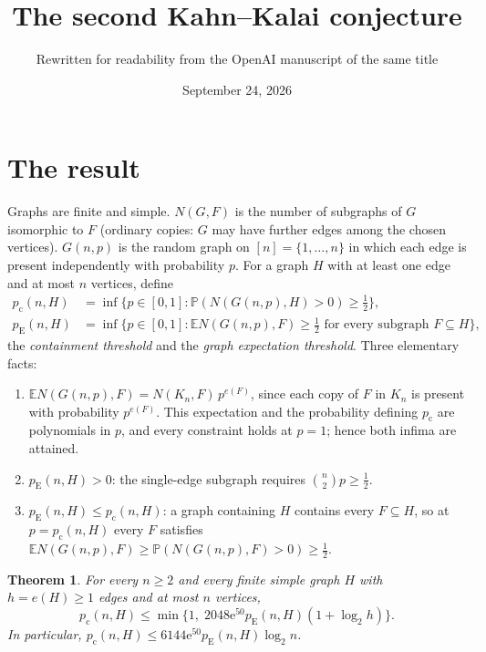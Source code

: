 \documentclass[11pt]{article}
\title{The second Kahn--Kalai conjecture}
\author{Rewritten for readability from the OpenAI manuscript of the same title}
\date{September 24, 2026}
\newtheorem{theorem}{Theorem}[section]
\numberwithin{equation}{section}
\newcommand{\PP}{\mathbb P}
\newcommand{\EE}{\mathbb E}
\newcommand{\pc}{p_{\mathrm c}}
\newcommand{\pE}{p_{\mathrm E}}
\newcommand{\ee}{\mathrm e}
\begin{document}
\maketitle

\section{The result}\label{sec:introduction}

Graphs are finite and simple. $N(G,F)$ is the number of subgraphs of $G$
isomorphic to $F$ (ordinary copies: $G$ may have further edges among the
chosen vertices). $G(n,p)$ is the random graph on $[n]=\{1,\ldots,n\}$ in
which each edge is present independently with probability $p$. For a graph
$H$ with at least one edge and at most $n$ vertices, define
\begin{align*}
 \pc(n,H)&=\inf\{p\in[0,1]:\PP(N(G(n,p),H)>0)\ge\tfrac12\},\\
 \pE(n,H)&=\inf\{p\in[0,1]:\EE N(G(n,p),F)\ge\tfrac12
                 \text{ for every subgraph }F\subseteq H\},
\end{align*}
the \emph{containment threshold} and the \emph{graph expectation
threshold}. Three elementary facts:
\begin{enumerate}[label=(\alph*),itemsep=1pt,topsep=3pt]
 \item\label{fact:a} $\EE N(G(n,p),F)=N(K_n,F)\,p^{e(F)}$, since each copy
 of $F$ in $K_n$ is present with probability $p^{e(F)}$. This expectation
 and the probability defining $\pc$ are polynomials in $p$, and every
 constraint holds at $p=1$; hence both infima are attained.
 \item $\pE(n,H)>0$: the single-edge subgraph requires
 $\binom n2p\ge\tfrac12$.
 \item $\pE(n,H)\le\pc(n,H)$: a graph containing $H$ contains every
 $F\subseteq H$, so at $p=\pc(n,H)$ every $F$ satisfies
 $\EE N(G(n,p),F)\ge\PP(N(G(n,p),F)>0)\ge\tfrac12$.
\end{enumerate}

\begin{theorem}\label{thm:main}
For every $n\ge2$ and every finite simple graph $H$ with $h=e(H)\ge1$
edges and at most $n$ vertices,
\begin{equation}\label{eq:stronger}
 \pc(n,H)\le
 \min\{1,\;2048\ee^{50}\pE(n,H)(1+\log_2 h)\}.
\end{equation}
In particular,
$\pc(n,H)\le6144\ee^{50}\pE(n,H)\log_2 n$.
\end{theorem}
\end{document}
